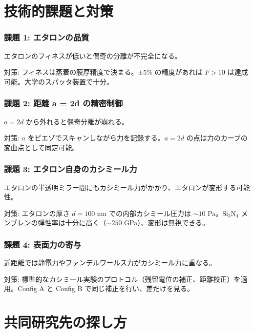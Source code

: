 \documentclass[12pt,a4paper]{article}
\begin{document}
\part{技術的課題と対策}

\section{課題 1: エタロンの品質}

エタロンのフィネスが低いと偶奇の分離が不完全になる。

対策: フィネスは蒸着の膜厚精度で決まる。$\pm 5\%$ の精度があれば $F > 10$ は達成可能。大学のスパッタ装置で十分。

\section{課題 2: 距離 a = 2d の精密制御}

$a = 2d$ から外れると偶奇分離が崩れる。

対策: $a$ をピエゾでスキャンしながら力を記録する。$a = 2d$ の点は力のカーブの変曲点として同定可能。

\section{課題 3: エタロン自身のカシミール力}

エタロンの半透明ミラー間にもカシミール力がかかり、エタロンが変形する可能性。

対策: エタロンの厚さ $d = 100$ nm での内部カシミール圧力は $\sim 10$ Pa。$\text{Si}_3\text{N}_4$ メンブレンの弾性率は十分に高く（$\sim 250$ GPa）、変形は無視できる。

\section{課題 4: 表面力の寄与}

近距離では静電力やファンデルワールス力がカシミール力に重なる。

対策: 標準的なカシミール実験のプロトコル（残留電位の補正、距離校正）を適用。Config A と Config B で同じ補正を行い、差だけを見る。

\part{共同研究先の探し方}
\end{document}
